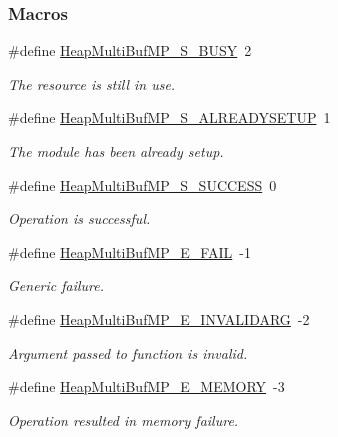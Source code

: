 \subsubsection*{Macros}
\begin{DoxyCompactItemize}
\item 
\#define \hyperlink{_heap_multi_buf_m_p_8h_a90c33c9402a75cbe4e26b02d8b399916}{Heap\-Multi\-Buf\-M\-P\-\_\-\-S\-\_\-\-B\-U\-S\-Y}~2
\begin{DoxyCompactList}\small\item\em The resource is still in use. \end{DoxyCompactList}\item 
\#define \hyperlink{_heap_multi_buf_m_p_8h_a8eb59b4affca50c201dc6e08ae1bb614}{Heap\-Multi\-Buf\-M\-P\-\_\-\-S\-\_\-\-A\-L\-R\-E\-A\-D\-Y\-S\-E\-T\-U\-P}~1
\begin{DoxyCompactList}\small\item\em The module has been already setup. \end{DoxyCompactList}\item 
\#define \hyperlink{_heap_multi_buf_m_p_8h_ab1e8f168212f49a10090c1e0e88eb891}{Heap\-Multi\-Buf\-M\-P\-\_\-\-S\-\_\-\-S\-U\-C\-C\-E\-S\-S}~0
\begin{DoxyCompactList}\small\item\em Operation is successful. \end{DoxyCompactList}\item 
\#define \hyperlink{_heap_multi_buf_m_p_8h_aa539c8b8eaab1a246208b00d3cb95d89}{Heap\-Multi\-Buf\-M\-P\-\_\-\-E\-\_\-\-F\-A\-I\-L}~-\/1
\begin{DoxyCompactList}\small\item\em Generic failure. \end{DoxyCompactList}\item 
\#define \hyperlink{_heap_multi_buf_m_p_8h_a1f636d17043946e189a176d6e87b6892}{Heap\-Multi\-Buf\-M\-P\-\_\-\-E\-\_\-\-I\-N\-V\-A\-L\-I\-D\-A\-R\-G}~-\/2
\begin{DoxyCompactList}\small\item\em Argument passed to function is invalid. \end{DoxyCompactList}\item 
\#define \hyperlink{_heap_multi_buf_m_p_8h_a651ef3b2e6c5fccca7d6e81937007d4e}{Heap\-Multi\-Buf\-M\-P\-\_\-\-E\-\_\-\-M\-E\-M\-O\-R\-Y}~-\/3
\begin{DoxyCompactList}\small\item\em Operation resulted in memory failure. \end{DoxyCompactList}\item 

\end{DoxyCompactItemize}
